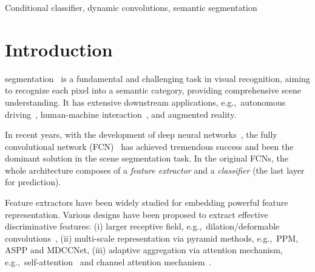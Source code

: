 \documentclass[journal]{IEEEtran}
\def\eg{e.g.,~}
\begin{document}
\begin{IEEEkeywords}
Conditional classifier, dynamic convolutions, semantic segmentation
\end{IEEEkeywords}


\IEEEpeerreviewmaketitle



\section{Introduction}
\label{sec:intro}

 segmentation~\cite{Huang-SPL-Soft-IoU-2019, Li-SPL-Proposal-2019, Arnab-SPM-CRF-2018, Zhou-WWW-Multi-scale-2019, Wang-CVPR-DSR-2020} 
is a fundamental and challenging task in visual recognition, 
aiming to recognize each pixel 
into a semantic category, 
providing comprehensive scene understanding.
It has extensive downstream applications, 
\eg autonomous driving~\cite{Badrinarayanan-PAMI-SegNet-2017, Kitti, Cityscapes, Zhou-ASC-AGLNet-2020}, 
human-machine interaction~\cite{Liang-PAMI-lip-2018}, 
and augmented reality.

In recent years,
with the development of deep neural networks~\cite{Krizhevsky-NIPS-Imagenet, Simonyan-ICLR-VGG-2015, He-CVPR-ResNet-2016, Huang-CVPR-DenseNet-2017},
the fully convolutional network (FCN)~\cite{Long-CVPR-FCN-2015}
has achieved tremendous success and been the dominant solution
in the scene segmentation task.
In the original FCNs, 
the whole architecture 
composes of a \emph{feature extractor} and a \emph{classifier} 
(the last layer for prediction).

Feature extractors
have been widely studied for 
embedding powerful feature representation.
Various designs have been proposed to 
extract effective discriminative features:
(i) larger receptive field, \eg dilation/deformable convolutions~\cite{Chen-ICLR-Deeplab-2016, Dai-ICCV-DCN-2017, Yu-ECCV-RepGraph-2020},
(ii) multi-scale representation via pyramid methods, \eg PPM\cite{Zhao-CVPR-PSPNet-2017}, ASPP\cite{Chen-Arxiv-Deeplabv3-2017} and MDCCNet\cite{Zhou-WWW-Multi-scale-2019},
(iii) adaptive aggregation via attention mechanism, \eg self-attention~\cite{Fu-TNNLS-DANet-2020, Wang-CVPR-Nonlocal-2018, Yu-CVPR-CPNet-2020} and channel attention mechanism~\cite{Yu-CVPR-DFN-2018, Hu-CVPR-SEnet-2017,Yu-ECCV-BiSeNet-2018,Yu-ARXIV-BiSeNetV2-2020,Zhou-ASC-AGLNet-2020}.
 
 
\end{document}
